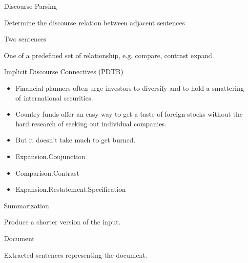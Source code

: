 \documentclass{beamer}
\begin{document}
\begin{frame}{Discourse Parsing}
  \begin{description} \itemsep 20pt
  \item[Goal] Determine the discourse relation between adjacent sentences
  \item[Input] Two sentences 
  \item[Output] One of a predefined set of relationship, e.g. compare, contrast expand.
  \end{description}  

\end{frame}

\begin{frame}{Implicit Discourse Connectives (PDTB)}
  \begin{itemize}
  \item \alert{Financial planners often urge investors to diversify and to
    hold a smattering of international securities.} 
  \item \alert{Country funds offer an easy
    way to get a taste of foreign stocks without the hard research of
    seeking out individual companies.} 
  \item \alert{But it doesn’t take
    much to get burned.} 
  \end{itemize}

  \begin{itemize}
  \item Expansion.Conjunction 
  \item Comparison.Contrast 
  \item Expansion.Restatement.Specification
  \end{itemize}
\end{frame}

\begin{frame}{Summarization}
  \begin{description} \itemsep 20pt
  \item[Goal] Produce a shorter version of the input.
  \item[Input] Document
  \item[Output] Extracted sentences representing the document.
  \end{description}  

\end{frame}
\end{document}
